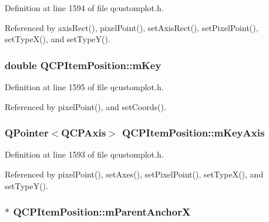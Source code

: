 Definition at line 1594 of file qcustomplot.\+h.



Referenced by axis\+Rect(), pixel\+Point(), set\+Axis\+Rect(), set\+Pixel\+Point(), set\+Type\+X(), and set\+Type\+Y().

\hypertarget{class_q_c_p_item_position_a4ff3931ad115603dfb4c7000b24bb415}{}
\subsubsection[{m\+Key}]{\setlength{\rightskip}{0pt plus 5cm}double Q\+C\+P\+Item\+Position\+::m\+Key\hspace{0.3cm}{\ttfamily [protected]}}\label{class_q_c_p_item_position_a4ff3931ad115603dfb4c7000b24bb415}


Definition at line 1595 of file qcustomplot.\+h.



Referenced by pixel\+Point(), and set\+Coords().

\hypertarget{class_q_c_p_item_position_a63967a33933231e92f68c8ce06bfc37e}{}
\subsubsection[{m\+Key\+Axis}]{\setlength{\rightskip}{0pt plus 5cm}Q\+Pointer$<${\bf Q\+C\+P\+Axis}$>$ Q\+C\+P\+Item\+Position\+::m\+Key\+Axis\hspace{0.3cm}{\ttfamily [protected]}}\label{class_q_c_p_item_position_a63967a33933231e92f68c8ce06bfc37e}


Definition at line 1593 of file qcustomplot.\+h.



Referenced by pixel\+Point(), set\+Axes(), set\+Pixel\+Point(), set\+Type\+X(), and set\+Type\+Y().

\hypertarget{class_q_c_p_item_position_a41b4641d18c90997b9c01bf304181bf0}{}
\subsubsection[{m\+Parent\+Anchor\+X}]{$\ast$ Q\+C\+P\+Item\+Position\+::m\+Parent\+Anchor\+X\hspace{0.3cm}{\ttfamily [protected]}}\label{class_q_c_p_item_position_a41b4641d18c90997b9c01bf304181bf0}


